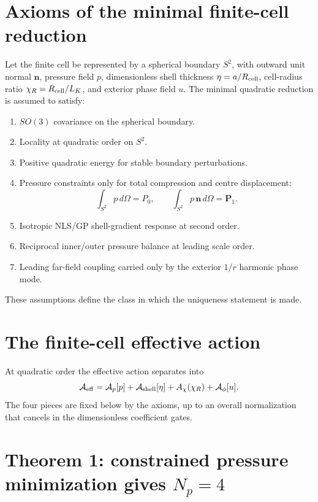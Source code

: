 \documentclass[11pt]{article}
\begin{document}
\section{Axioms of the minimal finite-cell reduction}

Let the finite cell be represented by a spherical boundary \(S^2\), with
outward unit normal \(\mathbf n\), pressure field \(p\), dimensionless shell
thickness \(\eta=a/R_{\rm cell}\), cell-radius ratio
\(\chi_R=R_{\rm cell}/L_K\), and exterior phase field \(u\).  The minimal
quadratic reduction is assumed to satisfy:
\begin{enumerate}[label=A\arabic*.]
\item \(SO(3)\) covariance on the spherical boundary.
\item Locality at quadratic order on \(S^2\).
\item Positive quadratic energy for stable boundary perturbations.
\item Pressure constraints only for total compression and centre displacement:
\[
  \int_{S^2}p\,d\Omega=P_0,\qquad
  \int_{S^2}p\,\mathbf n\,d\Omega=\mathbf P_1.
\]
\item Isotropic NLS/GP shell-gradient response at second order.
\item Reciprocal inner/outer pressure balance at leading scale order.
\item Leading far-field coupling carried only by the exterior \(1/r\) harmonic
phase mode.
\end{enumerate}

These assumptions define the class in which the uniqueness statement is made.

\section{The finite-cell effective action}

At quadratic order the effective action separates into
\[
  \mathcal A_{\rm eff}
  =
  \mathcal A_p[p]
  +
  \mathcal A_{\rm shell}[\eta]
  +
  A_\chi(\chi_R)
  +
  \mathcal A_\phi[u].
\]
The four pieces are fixed below by the axioms, up to an overall normalization
that cancels in the dimensionless coefficient gates.

\section{Theorem 1: constrained pressure minimization gives \(N_p=4\)}
\end{document}
